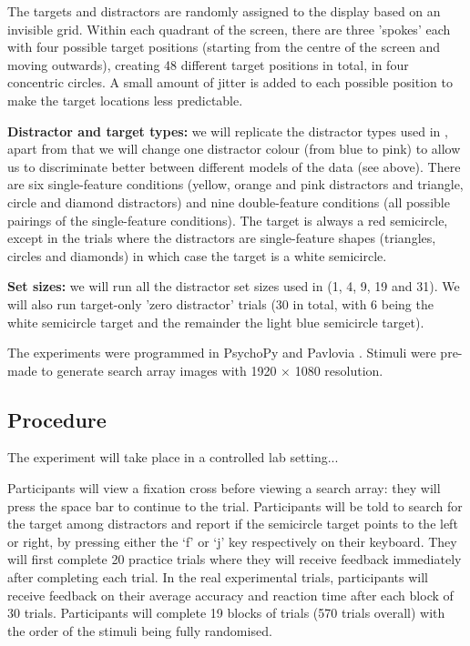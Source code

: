 \documentclass[preprint,12pt,authoryear]{elsarticle}
\begin{document}
The targets and distractors are randomly assigned to the display based on an invisible grid. Within each quadrant of the screen, there are three 'spokes' each with four possible target positions (starting from the centre of the screen and moving outwards), creating 48 different target positions in total, in four concentric circles. A small amount of jitter is added to each possible position to make the target locations less predictable.

\textbf{Distractor and target types:} we will replicate the distractor types used in \cite{buetti2019predicting}, apart from that we will change one distractor colour (from blue to pink) to allow us to discriminate better between different models of the data (see above). There are six single-feature conditions (yellow, orange and pink distractors and triangle, circle and diamond distractors) and nine double-feature conditions (all possible pairings of the single-feature conditions). The target is always a red semicircle, except in the trials where the distractors are single-feature shapes (triangles, circles and diamonds) in which case the target is a white semicircle.

\textbf{Set sizes:} we will run all the distractor set sizes used in \cite{buetti2019predicting} (1, 4, 9, 19 and 31). We will also run target-only 'zero distractor' trials (30 in total, with 6 being the white semicircle target and the remainder the light blue semicircle target).

The experiments were programmed in PsychoPy and Pavlovia \citep{peirce2019psychopy2}. Stimuli were pre-made to generate search array images with 1920 $\times$ 1080 resolution. 

\subsection{Procedure}

The experiment will take place in a controlled lab setting...

Participants will view a fixation cross before viewing a search array: they will press the space bar to continue to the trial. Participants will be told to search for the target among distractors and report if the semicircle target points to the left or right, by pressing either the `f' or `j' key respectively on their keyboard. They will first complete 20 practice trials where they will receive feedback immediately after completing each trial. In the real experimental trials, participants will receive feedback on their average accuracy and reaction time after each block of 30 trials. Participants will complete 19 blocks of trials (570 trials overall) with the order of the stimuli being fully randomised.
 
\end{document}
